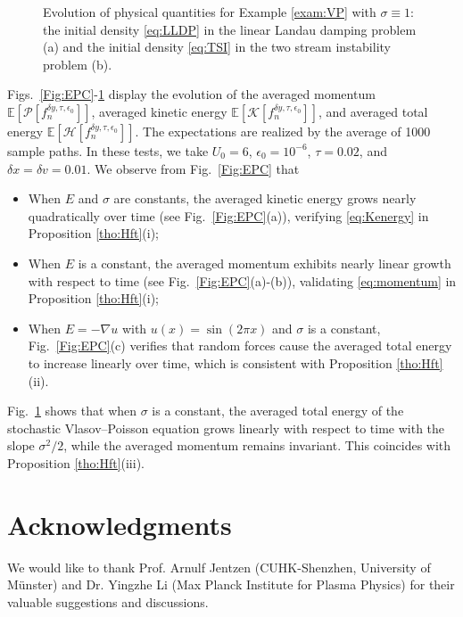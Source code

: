 \documentclass[11pt,reqno]{amsproc}
\numberwithin{equation}{section}
\newcommand{\E}{\mathbb{E}}\allowdisplaybreaks[4]
\begin{document}
\begin{figure}[!htbp]
\centering
 \hspace{4em}
  \caption{Evolution of physical quantities for Example \ref{exam:VP} with $\sigma\equiv1$: the initial density \eqref{eq:LLDP} in the linear Landau damping problem \textup{(}a\textup{)} and the initial density \eqref{eq:TSI} 
 in the two stream instability problem \textup{(}b\textup{)}. 
}\label{Fig:EPCVP}
\end{figure}


Figs.\ \ref{Fig:EPC}-\ref{Fig:EPCVP} display the evolution of the averaged momentum $\E[\mathcal P[f_n^{\delta y,\tau,\epsilon_0}]]$, averaged kinetic energy $\E[\mathcal K[f_n^{\delta y,\tau,\epsilon_0}]]$, and averaged
total energy $\E[\mathcal H[f_n^{\delta y,\tau,\epsilon_0}]]$. 
 The expectations are realized by the average of 1000 sample paths.
 In these tests, we take
$U_0=6$, $\epsilon_0=10^{-6}$, $\tau=0.02$, and $\delta x=\delta v=0.01$. We observe from Fig.\ \ref{Fig:EPC} that
\begin{itemize}%
\item[(1)] When $E$ and $\sigma$ are constants, the averaged kinetic energy grows nearly quadratically over time (see Fig.\ \ref{Fig:EPC}(a)), verifying \eqref{eq:Kenergy} in Proposition \ref{tho:Hft}(i);
\item[(2)] When $E$ is a constant, the averaged momentum exhibits nearly linear growth with respect to time (see Fig.\ \ref{Fig:EPC}(a)-(b)), validating \eqref{eq:momentum} in Proposition \ref{tho:Hft}(i);
\item[(3)] When $E=-\nabla u$ with $u(x)=\sin(2\pi x)$ and $\sigma$ is a constant, Fig.\ \ref{Fig:EPC}(c) verifies that random forces 
cause the averaged total energy to increase linearly over time, which is consistent with Proposition \ref{tho:Hft}(ii). 
\end{itemize}
Fig.\ \ref{Fig:EPCVP} shows that when $\sigma$ is a constant, the averaged total energy of the stochastic Vlasov--Poisson equation grows linearly with respect to time with the slope $\sigma^2/2$, while the averaged momentum remains invariant.
This coincides with Proposition \ref{tho:Hft}(iii).

\section*{Acknowledgments}
We would like to thank Prof. Arnulf Jentzen (CUHK-Shenzhen, University of Münster) and Dr. Yingzhe Li (Max Planck Institute for Plasma Physics)
 for their valuable suggestions and discussions. 





\end{document}
